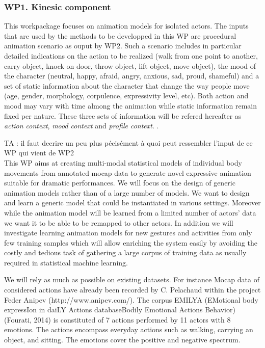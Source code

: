 
\subsubsection{WP1. Kinesic component} 

This workpackage focuses on animation models for isolated actors. The inputs that are used by the methods to be developped in this WP are procedural animation scenario as ouput by WP2. Such a scenario includes in particular detailed indications on the action to be realized (walk from one point to another, carry object, knock on door, throw object, lift object, move object), the mood of the character (neutral, happy, afraid, angry, anxious, sad, proud, shameful) and a set of static information about the character that change the way people move (age, gender, morphology, corpulence, expressivity level, etc). Both action and mood may vary with time almong the animation while static information remain fixed per nature. These three sets of information will be refered hereafter as \textit{action context}, \textit{mood context} and \textit{profile context}. . 

TA : il faut decrire un peu plus pécisément à quoi peut ressembler l'input de ce WP qui vient de WP2\\

This WP aims at creating multi-modal statistical models of individual body movements from annotated mocap data to generate novel expressive animation suitable for  dramatic performances. We will focus on the design of generic animation models rather than of a large number of models. We want to design and learn a generic model that could be instantiated in various settings. Moreover while the animation model will be learned from a limited number of actors' data we want it to be able to be remapped to other actors. In addition we will investigate learning animation models for new gestures and activities from only few training samples which will allow enriching the system easily by avoiding the costly and tedious task of gathering a large corpus of training data as usually required in statistical machine learning.  


We will rely as much as possible on existing datasets. For instance Mocap data of considered actions have already been recorded by C. Pelachaud within the project Feder Anipev (http://www.anipev.com/). The corpus EMILYA (EMotional body expressIon in daiLY Actions databaseBodily Emotional Actions Behavior) (Fourati, 2014) is constituted of 7 actions performed by 11 actors with 8 emotions. The actions encompass everyday actions such as walking, carrying an object, and sitting. The emotions cover the positive and negative spectrum. 

